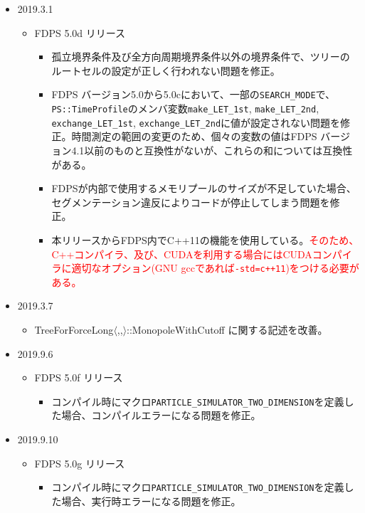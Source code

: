 \begin{itemize}
  \item 2019.3.1
    \begin{itemize}
    \item FDPS 5.0d リリース
       \begin{itemize}
          \item 孤立境界条件及び全方向周期境界条件以外の境界条件で、ツリーのルートセルの設定が正しく行われない問題を修正。
          \item FDPS バージョン5.0から5.0cにおいて、一部の\texttt{SEARCH\_MODE}で、\texttt{PS::TimeProfile}のメンバ変数\texttt{make\_LET\_1st}, \texttt{make\_LET\_2nd}, \texttt{exchange\_LET\_1st}, \texttt{exchange\_LET\_2nd}に値が設定されない問題を修正。時間測定の範囲の変更のため、個々の変数の値はFDPS バージョン4.1以前のものと互換性がないが、これらの和については互換性がある。
          \item FDPSが内部で使用するメモリプールのサイズが不足していた場合、セグメンテーション違反によりコードが停止してしまう問題を修正。
          \item 本リリースからFDPS内でC++11の機能を使用している。\textcolor{red}{そのため、C++コンパイラ、及び、CUDAを利用する場合にはCUDAコンパイラに適切なオプション(GNU gccであれば\texttt{-std=c++11})をつける必要がある。}
       \end{itemize}
    \end{itemize}

  \item 2019.3.7
    \begin{itemize}
    \item TreeForForceLong$\langle$,,$\rangle$::MonopoleWithCutoff に関する記述を改善。
    \end{itemize}

  \item 2019.9.6
    \begin{itemize}
    \item FDPS 5.0f リリース
       \begin{itemize}
          \item コンパイル時にマクロ\texttt{PARTICLE\_SIMULATOR\_TWO\_DIMENSION}を定義した場合、コンパイルエラーになる問題を修正。
       \end{itemize}
    \end{itemize}

  \item 2019.9.10
    \begin{itemize}
    \item FDPS 5.0g リリース
       \begin{itemize}
          \item コンパイル時にマクロ\texttt{PARTICLE\_SIMULATOR\_TWO\_DIMENSION}を定義した場合、実行時エラーになる問題を修正。
       \end{itemize}
    \end{itemize}


\end{itemize}

